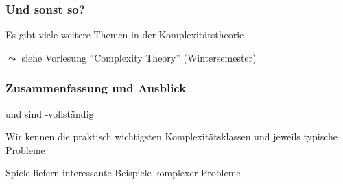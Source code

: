 \documentclass[aspectratio=1610,onlymath]{beamer}
\begin{document}
\begin{frame}\frametitle{Und sonst so?}

Es gibt viele weitere Themen in der Komplexitätstheorie
\bigskip

$\leadsto$ siehe Vorlesung "`Complexity Theory"' (Wintersemester)

\end{frame}


\begin{frame}\frametitle{Zusammenfassung und Ausblick}

 und  sind \PSpace-vollständig
\bigskip

Wir kennen die praktisch wichtigsten Komplexitätsklassen und jeweils typische Probleme
\bigskip

Spiele liefern interessante Beispiele komplexer Probleme
\bigskip


\end{frame}



% 
% 
% 
% 
% 
% 
\end{document}
